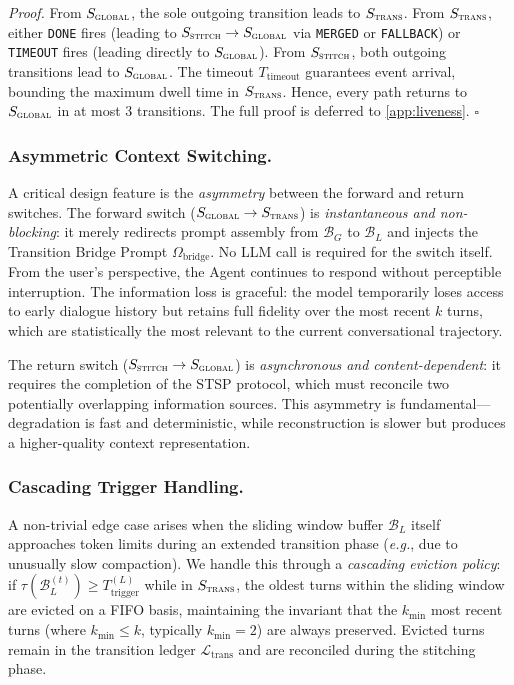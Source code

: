 \documentclass[10pt,twocolumn]{article}
\newcommand{\bufG}{\mathcal{B}_G}
\newcommand{\bufL}{\mathcal{B}_L}
\newcommand{\Dtok}{\tau}
\newcommand{\eg}{\textit{e.g.}}
\begin{document}
\textit{Proof.} From $S_{\textsc{global}}$, the sole outgoing transition leads to $S_{\textsc{trans}}$. From $S_{\textsc{trans}}$, either \texttt{DONE} fires (leading to $S_{\textsc{stitch}} \rightarrow S_{\textsc{global}}$ via \texttt{MERGED} or \texttt{FALLBACK}) or \texttt{TIMEOUT} fires (leading directly to $S_{\textsc{global}}$). From $S_{\textsc{stitch}}$, both outgoing transitions lead to $S_{\textsc{global}}$. The timeout $T_{\mathrm{timeout}}$ guarantees event arrival, bounding the maximum dwell time in $S_{\textsc{trans}}$. Hence, every path returns to $S_{\textsc{global}}$ in at most 3 transitions. The full proof is deferred to \cref{app:liveness}. $\square$

\subsubsection{Asymmetric Context Switching.}\label{sec:asymmetric}

A critical design feature is the \emph{asymmetry} between the forward and return switches. The forward switch ($S_{\textsc{global}} \rightarrow S_{\textsc{trans}}$) is \emph{instantaneous and non-blocking}: it merely redirects prompt assembly from $\bufG$ to $\bufL$ and injects the Transition Bridge Prompt $\Omega_{\mathrm{bridge}}$. No LLM call is required for the switch itself. From the user's perspective, the Agent continues to respond without perceptible interruption. The information loss is graceful: the model temporarily loses access to early dialogue history but retains full fidelity over the most recent $k$ turns, which are statistically the most relevant to the current conversational trajectory.

The return switch ($S_{\textsc{stitch}} \rightarrow S_{\textsc{global}}$) is \emph{asynchronous and content-dependent}: it requires the completion of the STSP protocol, which must reconcile two potentially overlapping information sources. This asymmetry is fundamental---degradation is fast and deterministic, while reconstruction is slower but produces a higher-quality context representation.

\subsubsection{Cascading Trigger Handling.}\label{sec:cascading}

A non-trivial edge case arises when the sliding window buffer $\bufL$ itself approaches token limits during an extended transition phase (\eg, due to unusually slow compaction). We handle this through a \emph{cascading eviction policy}: if $\Dtok(\bufL^{(t)}) \geq T_{\mathrm{trigger}}^{(L)}$ while in $S_{\textsc{trans}}$, the oldest turns within the sliding window are evicted on a FIFO basis, maintaining the invariant that the $k_{\min}$ most recent turns (where $k_{\min} \leq k$, typically $k_{\min} = 2$) are always preserved. Evicted turns remain in the transition ledger $\mathcal{L}_{\mathrm{trans}}$ and are reconciled during the stitching phase.
\end{document}
